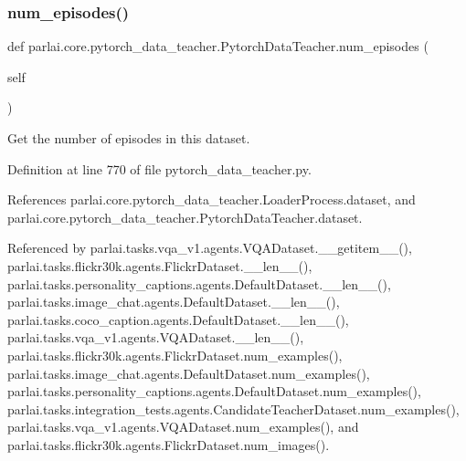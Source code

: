 \subsubsection{\texorpdfstring{num\+\_\+episodes()}{num\_episodes()}}
{\footnotesize\ttfamily def parlai.\+core.\+pytorch\+\_\+data\+\_\+teacher.\+Pytorch\+Data\+Teacher.\+num\+\_\+episodes (\begin{DoxyParamCaption}\item[{}]{self }\end{DoxyParamCaption})}

\begin{DoxyVerb}Get the number of episodes in this dataset.\end{DoxyVerb}
 

Definition at line 770 of file pytorch\+\_\+data\+\_\+teacher.\+py.



References parlai.\+core.\+pytorch\+\_\+data\+\_\+teacher.\+Loader\+Process.\+dataset, and parlai.\+core.\+pytorch\+\_\+data\+\_\+teacher.\+Pytorch\+Data\+Teacher.\+dataset.



Referenced by parlai.\+tasks.\+vqa\+\_\+v1.\+agents.\+V\+Q\+A\+Dataset.\+\_\+\+\_\+getitem\+\_\+\+\_\+(), parlai.\+tasks.\+flickr30k.\+agents.\+Flickr\+Dataset.\+\_\+\+\_\+len\+\_\+\+\_\+(), parlai.\+tasks.\+personality\+\_\+captions.\+agents.\+Default\+Dataset.\+\_\+\+\_\+len\+\_\+\+\_\+(), parlai.\+tasks.\+image\+\_\+chat.\+agents.\+Default\+Dataset.\+\_\+\+\_\+len\+\_\+\+\_\+(), parlai.\+tasks.\+coco\+\_\+caption.\+agents.\+Default\+Dataset.\+\_\+\+\_\+len\+\_\+\+\_\+(), parlai.\+tasks.\+vqa\+\_\+v1.\+agents.\+V\+Q\+A\+Dataset.\+\_\+\+\_\+len\+\_\+\+\_\+(), parlai.\+tasks.\+flickr30k.\+agents.\+Flickr\+Dataset.\+num\+\_\+examples(), parlai.\+tasks.\+image\+\_\+chat.\+agents.\+Default\+Dataset.\+num\+\_\+examples(), parlai.\+tasks.\+personality\+\_\+captions.\+agents.\+Default\+Dataset.\+num\+\_\+examples(), parlai.\+tasks.\+integration\+\_\+tests.\+agents.\+Candidate\+Teacher\+Dataset.\+num\+\_\+examples(), parlai.\+tasks.\+vqa\+\_\+v1.\+agents.\+V\+Q\+A\+Dataset.\+num\+\_\+examples(), and parlai.\+tasks.\+flickr30k.\+agents.\+Flickr\+Dataset.\+num\+\_\+images().

